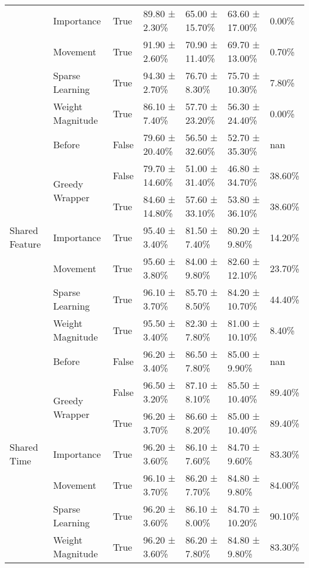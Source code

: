 \begin{tabular}{lllllll}
\cline{2-7}
 & Importance & True & 89.80 ± 2.30\% & 65.00 ± 15.70\% & 63.60 ± 17.00\% & 0.00\% \\
\cline{2-7}
 & Movement & True & 91.90 ± 2.60\% & 70.90 ± 11.40\% & 69.70 ± 13.00\% & 0.70\% \\
\cline{2-7}
 & Sparse Learning & True & 94.30 ± 2.70\% & 76.70 ± 8.30\% & 75.70 ± 10.30\% & 7.80\% \\
\cline{2-7}
 & Weight Magnitude & True & 86.10 ± 7.40\% & 57.70 ± 23.20\% & 56.30 ± 24.40\% & 0.00\% \\
\cline{1-7} \cline{2-7}
\multirow[t]{7}{*}{Shared Feature} & Before & False & 79.60 ± 20.40\% & 56.50 ± 32.60\% & 52.70 ± 35.30\% & nan \\
\cline{2-7}
 & \multirow[t]{2}{*}{Greedy Wrapper} & False & 79.70 ± 14.60\% & 51.00 ± 31.40\% & 46.80 ± 34.70\% & 38.60\% \\
 &  & True & 84.60 ± 14.80\% & 57.60 ± 33.10\% & 53.80 ± 36.10\% & 38.60\% \\
\cline{2-7}
 & Importance & True & 95.40 ± 3.40\% & 81.50 ± 7.40\% & 80.20 ± 9.80\% & 14.20\% \\
\cline{2-7}
 & Movement & True & 95.60 ± 3.80\% & 84.00 ± 9.80\% & 82.60 ± 12.10\% & 23.70\% \\
\cline{2-7}
 & Sparse Learning & True & 96.10 ± 3.70\% & 85.70 ± 8.50\% & 84.20 ± 10.70\% & 44.40\% \\
\cline{2-7}
 & Weight Magnitude & True & 95.50 ± 3.40\% & 82.30 ± 7.80\% & 81.00 ± 10.10\% & 8.40\% \\
\cline{1-7} \cline{2-7}
\multirow[t]{7}{*}{Shared Time} & Before & False & 96.20 ± 3.40\% & 86.50 ± 7.80\% & 85.00 ± 9.90\% & nan \\
\cline{2-7}
 & \multirow[t]{2}{*}{Greedy Wrapper} & False & 96.50 ± 3.20\% & 87.10 ± 8.10\% & 85.50 ± 10.40\% & 89.40\% \\
 &  & True & 96.20 ± 3.70\% & 86.60 ± 8.20\% & 85.00 ± 10.40\% & 89.40\% \\
\cline{2-7}
 & Importance & True & 96.20 ± 3.60\% & 86.10 ± 7.60\% & 84.70 ± 9.60\% & 83.30\% \\
\cline{2-7}
 & Movement & True & 96.10 ± 3.70\% & 86.20 ± 7.70\% & 84.80 ± 9.80\% & 84.00\% \\
\cline{2-7}
 & Sparse Learning & True & 96.20 ± 3.60\% & 86.10 ± 8.00\% & 84.70 ± 10.20\% & 90.10\% \\
\cline{2-7}
 & Weight Magnitude & True & 96.20 ± 3.60\% & 86.20 ± 7.80\% & 84.80 ± 9.80\% & 83.30\% \\
\cline{1-7} \cline{2-7}
\bottomrule
\end{tabular}
